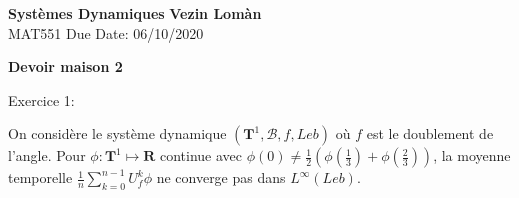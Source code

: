 \documentclass[12pt]{article}
\newenvironment{statement}[1]
{\begin{mdframed}[linewidth=0.6pt]
        Exercice \textsc{#1:}

}
    {\end{mdframed}}
\newcommand{\R}{\mathbf{R}}
\begin{document}
        \noindent
\textbf{Systèmes Dynamiques} \hfill \textbf{Vezin Lomàn}\\
\normalsize MAT551 \hfill Due Date: 06/10/2020\\

\begin{center}
\textbf{Devoir maison 2}
\end{center}

\begin{statement}{1}
        On considère le système dynamique $(\mathbf{T}^{1}, \mathcal{B}, f, Leb)$ où $f$ est le doublement de l'angle. Pour $\phi : \mathbf{T}^{1} \longmapsto \R$ continue avec $\phi(0) \neq \frac{1}{2}(\phi(\frac{1}{3})+\phi(\frac{2}{3}))$, la moyenne temporelle $\frac{1}{n}\sum_{k=0}^{n-1} U_{f}^{k}\phi$ ne converge pas dans $L^{\infty}(Leb)$.
\end{statement}
\end{document}
